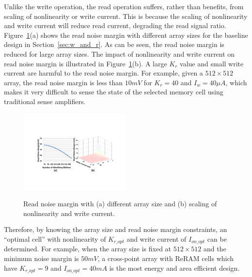 Unlike the write operation, the read operation suffers, rather than
benefits, from scaling of nonlinearity or write current. This is because
the scaling of nonlinearity and write current will reduce read current,
degrading the read signal ratio. Figure~\ref{fig:sense_margin}(a) shows
the read noise margin with different array sizes for the baseline design
in Section~\ref{sec:w_and_r}.  As can be seen, the read noise margin is
reduced for large array sizes. The impact of nonlinearity and write
current on read noise margin is illustrated in
Figure~\ref{fig:sense_margin}(b). A large $K_r$ value and small write
current are harmful to the read noise margin. For example, given a $512
\times 512$ array, the read noise margin is less than $10mV$ for $K_r=40$
and $I_w=40\mu A$, which makes it very difficult to sense the state of the
selected memory cell using traditional sense amplifiers.

\begin{figure}[!t]
\centering
  \includegraphics[width=0.5\textwidth]{./figures/read}\\
  \caption{Read noise margin with (a) different array size and (b) scaling of nonlinearity and write current.}\label{fig:sense_margin}
  \vspace{-5pt}
\end{figure}

Therefore, by knowing the array size and read noise margin constraints, an
``optimal cell'' with nonlinearity of $K_{r\_opt}$ and write current of
$I_{on\_opt}$ can be determined. For example, when the array size is fixed
at $512 \times 512$ and the minimum noise margin is $50mV$, a cross-point
array with ReRAM cells which have $K_{r\_opt} = 9$ and $I_{on\_opt} =
40mA$ is the most energy and area efficient design.


